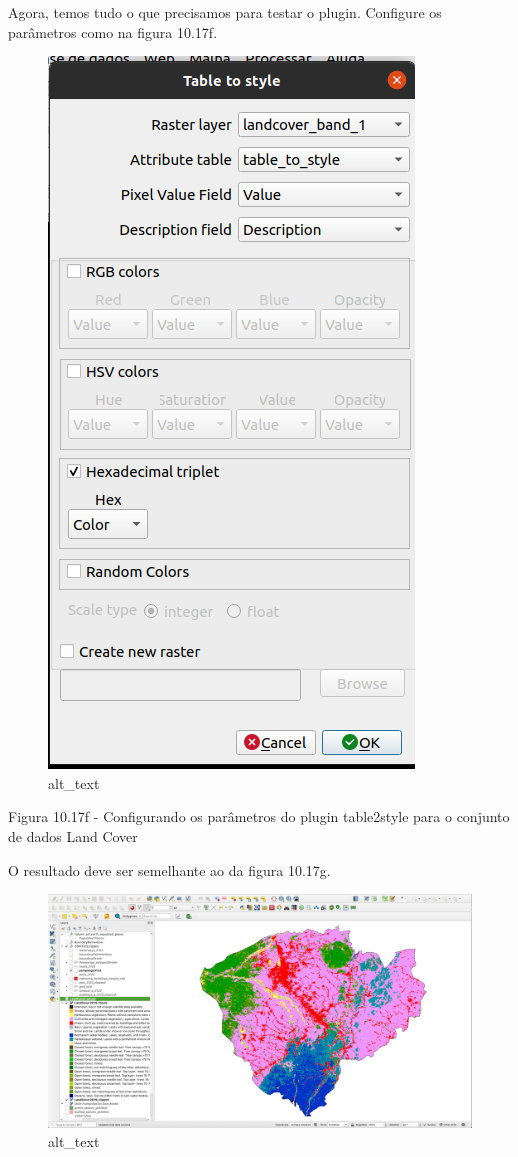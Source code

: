 \documentclass[
  portuguese,
]{krantz}
\begin{document}
Agora, temos tudo o que precisamos para testar o plugin. Configure os parâmetros como na figura 10.17f.

\begin{figure}
\centering
\includegraphics{media/modulo10/fig1017_f.png}
\caption{alt\_text}
\end{figure}

Figura 10.17f - Configurando os parâmetros do plugin table2style para o conjunto de dados Land Cover

O resultado deve ser semelhante ao da figura 10.17g.

\begin{figure}
\centering
\includegraphics{media/modulo10/fig1017_g.png}
\caption{alt\_text}
\end{figure}
\end{document}
